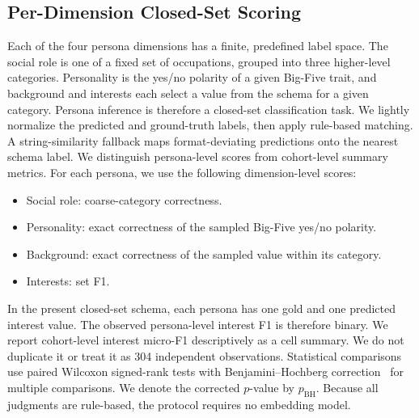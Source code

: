 \documentclass{ieeeaccess}
\begin{document}
\subsection{Per-Dimension Closed-Set Scoring}
Each of the four persona dimensions has a finite, predefined label space. The social role is
one of a fixed set of occupations, grouped into three higher-level categories. Personality is
the yes/no polarity of a given Big-Five trait, and background and interests each select a
value from the schema for a given category. Persona inference is therefore a closed-set classification task. We lightly normalize
the predicted and ground-truth labels, then apply rule-based matching. A string-similarity
fallback maps format-deviating predictions onto the nearest schema label.
%
We distinguish persona-level scores from cohort-level summary metrics. For each persona,
we use the following dimension-level scores:
\begin{itemize}
    \item Social role: coarse-category correctness.
    \item Personality: exact correctness of the sampled Big-Five yes/no polarity.
    \item Background: exact correctness of the sampled value within its category.
    \item Interests: set F1.
\end{itemize}
In the present closed-set schema, each persona has one gold and one predicted interest
value. The observed persona-level interest F1 is therefore binary. We report cohort-level
interest micro-F1 descriptively as a cell summary. We do not duplicate it or treat it as
304 independent observations. Statistical comparisons use paired Wilcoxon signed-rank
tests with Benjamini--Hochberg correction~\cite{benjamini1995} for multiple comparisons.
We denote the corrected $p$-value by $p_{\mathrm{BH}}$. Because all judgments are rule-based,
the protocol requires no embedding model.
\end{document}
